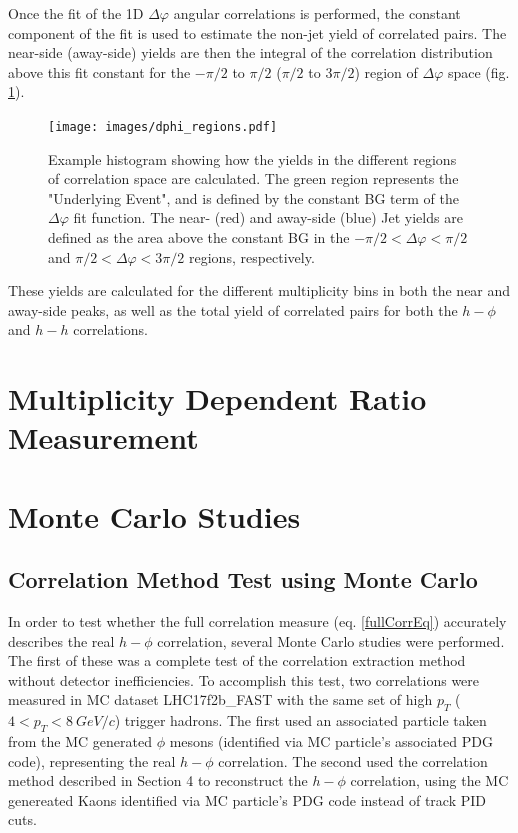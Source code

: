 \documentclass[ALICE,manyauthors]{ALICE_analysis_notes}
\begin{document}
Once the fit of the 1D $\Delta\varphi$ angular correlations is performed, the constant component of the fit is used to estimate the non-jet yield of correlated pairs.  The near-side (away-side) yields are then the integral of the correlation distribution above this fit constant for the $-\pi/2$ to $\pi/2$ ($\pi/2$ to $3\pi/2$) region of $\Delta\varphi$ space (fig. \ref{regions}).

\begin{figure}[ht]
\centering
\texttt{[image: images/dphi\_regions.pdf]}
\caption{Example histogram showing how the yields in the different regions of correlation space are calculated.  The green region represents the "Underlying Event", and is defined by the constant BG term of the $\Delta\varphi$ fit function.  The near- (red) and away-side (blue) Jet yields are defined as the area above the constant BG in the $-\pi/2 < \Delta\varphi < \pi/2$ and $\pi/2 < \Delta\varphi < 3\pi/2$ regions, respectively.}
\label{regions}
\end{figure}

These yields are calculated for the different multiplicity bins in both the near and away-side peaks, as well as the total yield of correlated pairs for both the $h-\phi$ and $h-h$ correlations.


\section{Multiplicity Dependent Ratio Measurement}


\section{Monte Carlo Studies}

\subsection{Correlation Method Test using Monte Carlo}

In order to test whether the full correlation measure (eq. \ref{fullCorrEq}) accurately describes the real $h-\phi$ correlation, several Monte Carlo studies were performed.  The first of these was a complete test of the correlation extraction method without detector inefficiencies.  To accomplish this test, two correlations were measured in MC dataset LHC17f2b\_FAST with the same set of high $p_T$ ($4 < p_T < \SI{8}{GeV/c}$) trigger hadrons.  The first used an associated particle taken from the MC generated $\phi$ mesons (identified via MC particle's associated PDG code), representing the real $h-\phi$ correlation. The second used the correlation method described in Section 4 to reconstruct the $h-\phi$ correlation, using the MC genereated Kaons identified via MC particle's PDG code instead of track PID cuts.
\end{document}
